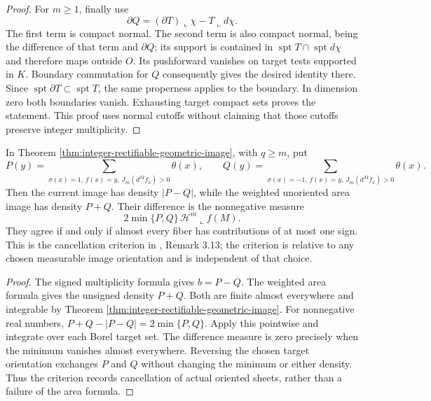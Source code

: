 \begin{proof}
For $m\geq1$, finally use
\[
 \partial Q=(\partial T)\llcorner\chi-T\llcorner d\chi.
\]
The first term is compact normal. The second term is also compact normal, being the difference of that term and $\partial Q$; its support is contained in $\operatorname{spt}T\cap\operatorname{spt}d\chi$ and therefore maps outside $O$. Its pushforward vanishes on target tests supported in $K$. Boundary commutation for $Q$ consequently gives the desired identity there. Since $\operatorname{spt}\partial T\subset\operatorname{spt}T$, the same properness applies to the boundary. In dimension zero both boundaries vanish. Exhausting target compact sets proves the statement. This proof uses normal cutoffs without claiming that those cutoffs preserve integer multiplicity.
\end{proof}

\begin{proposition}\label{prop:pushforward-cancellation-mass}
In Theorem \ref{thm:integer-rectifiable-geometric-image}, with $q\geq m$, put
\[
 P(y)=\sum_{\sigma(x)=1,\,f(x)=y,\,J_m(d^Mf_x)>0}\theta(x),
 \qquad
 Q(y)=\sum_{\sigma(x)=-1,\,f(x)=y,\,J_m(d^Mf_x)>0}\theta(x).
\]
Then the current image has density $|P-Q|$, while the weighted unoriented area image has density $P+Q$. Their difference is the nonnegative measure
\[
 2\min\{P,Q\}\,\mathcal H^m\llcorner f(M).
\]
They agree if and only if almost every fiber has contributions of at most one sign. This is the cancellation criterion in \cite{Sim18}, Remark 3.13; the criterion is relative to any chosen measurable image orientation and is independent of that choice.
\end{proposition}
\begin{proof}
The signed multiplicity formula gives $b=P-Q$. The weighted area formula gives the unsigned density $P+Q$. Both are finite almost everywhere and integrable by Theorem \ref{thm:integer-rectifiable-geometric-image}. For nonnegative real numbers, $P+Q-|P-Q|=2\min\{P,Q\}$. Apply this pointwise and integrate over each Borel target set. The difference measure is zero precisely when the minimum vanishes almost everywhere. Reversing the chosen target orientation exchanges $P$ and $Q$ without changing the minimum or either density. Thus the criterion records cancellation of actual oriented sheets, rather than a failure of the area formula.
\end{proof}
